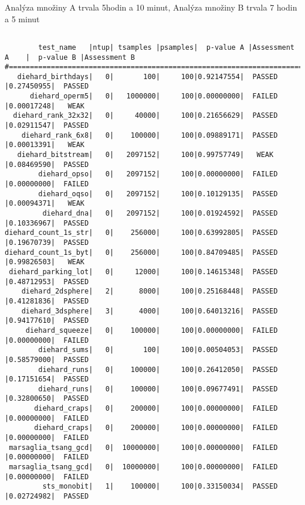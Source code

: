 \documentclass[a4paper]{article}
\begin{document}
\noindent Analýza množiny A trvala 5hodin a 10 minut, Analýza množiny B trvala 7 hodin a 5 minut

\begin{Verbatim}[fontsize=\tiny]

        test_name   |ntup| tsamples |psamples|  p-value A |Assessment A    |  p-value B |Assessment B
#===========================================================================================================#===#
   diehard_birthdays|   0|       100|     100|0.92147554|  PASSED          |0.27450955|  PASSED  
      diehard_operm5|   0|   1000000|     100|0.00000000|  FAILED          |0.00017248|   WEAK   
  diehard_rank_32x32|   0|     40000|     100|0.21656629|  PASSED          |0.02911547|  PASSED  
    diehard_rank_6x8|   0|    100000|     100|0.09889171|  PASSED          |0.00013391|   WEAK   
   diehard_bitstream|   0|   2097152|     100|0.99757749|   WEAK           |0.08469590|  PASSED  
        diehard_opso|   0|   2097152|     100|0.00000000|  FAILED          |0.00000000|  FAILED  
        diehard_oqso|   0|   2097152|     100|0.10129135|  PASSED          |0.00094371|   WEAK   
         diehard_dna|   0|   2097152|     100|0.01924592|  PASSED          |0.10336967|  PASSED  
diehard_count_1s_str|   0|    256000|     100|0.63992805|  PASSED          |0.19670739|  PASSED  
diehard_count_1s_byt|   0|    256000|     100|0.84709485|  PASSED          |0.99826503|   WEAK   
 diehard_parking_lot|   0|     12000|     100|0.14615348|  PASSED          |0.48712953|  PASSED  
    diehard_2dsphere|   2|      8000|     100|0.25168448|  PASSED          |0.41281836|  PASSED  
    diehard_3dsphere|   3|      4000|     100|0.64013216|  PASSED          |0.94177610|  PASSED  
     diehard_squeeze|   0|    100000|     100|0.00000000|  FAILED          |0.00000000|  FAILED  
        diehard_sums|   0|       100|     100|0.00504053|  PASSED          |0.58579000|  PASSED  
        diehard_runs|   0|    100000|     100|0.26412050|  PASSED          |0.17151654|  PASSED  
        diehard_runs|   0|    100000|     100|0.09677491|  PASSED          |0.32800650|  PASSED  
       diehard_craps|   0|    200000|     100|0.00000000|  FAILED          |0.00000000|  FAILED  
       diehard_craps|   0|    200000|     100|0.00000000|  FAILED          |0.00000000|  FAILED  
 marsaglia_tsang_gcd|   0|  10000000|     100|0.00000000|  FAILED          |0.00000000|  FAILED  
 marsaglia_tsang_gcd|   0|  10000000|     100|0.00000000|  FAILED          |0.00000000|  FAILED  
         sts_monobit|   1|    100000|     100|0.33150034|  PASSED          |0.02724982|  PASSED  

\end{Verbatim}
\end{document}
